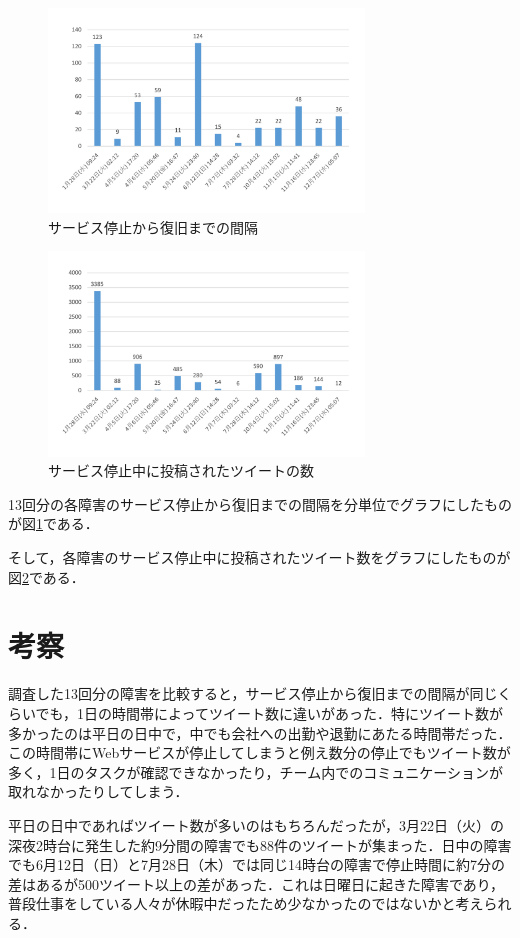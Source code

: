 \documentclass[uplatex,twocolumn]{jsarticle}
\begin{document}
\begin{figure}[H]
\includegraphics[width=8.4cm,clip]{graph1.pdf}
\caption{サービス停止から復旧までの間隔}\label{時間}
\end{figure}
\begin{figure}[H]
\includegraphics[width=8.4cm,clip]{graph2.pdf}
\caption{サービス停止中に投稿されたツイートの数}\label{ツイート数}
\end{figure}
13回分の各障害のサービス停止から復旧までの間隔を分単位でグラフにしたものが図\ref{時間}である．

そして，各障害のサービス停止中に投稿されたツイート数をグラフにしたものが図\ref{ツイート数}である．

\section{考察}
調査した13回分の障害を比較すると，サービス停止から復旧までの間隔が同じくらいでも，1日の時間帯によってツイート数に違いがあった．特にツイート数が多かったのは平日の日中で，中でも会社への出勤や退勤にあたる時間帯だった．この時間帯にWebサービスが停止してしまうと例え数分の停止でもツイート数が多く，1日のタスクが確認できなかったり，チーム内でのコミュニケーションが取れなかったりしてしまう．

平日の日中であればツイート数が多いのはもちろんだったが，3月22日（火）の深夜2時台に発生した約9分間の障害でも88件のツイートが集まった．日中の障害でも6月12日（日）と7月28日（木）では同じ14時台の障害で停止時間に約7分の差はあるが500ツイート以上の差があった．これは日曜日に起きた障害であり，普段仕事をしている人々が休暇中だったため少なかったのではないかと考えられる．
\end{document}
